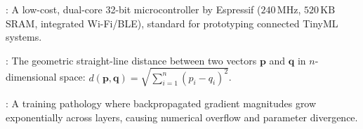 \begin{description}[leftmargin=!,labelwidth=4.5cm,itemsep=1.5ex]
\item[\textbf{ESP32}\hfill \textnormal{\sffamily\scriptsize\color{keyideablue}[IoT \& Hardware]}]: A low-cost, dual-core 32-bit microcontroller by Espressif ($240\,\text{MHz}$, $520\,\text{KB}$ SRAM, integrated Wi-Fi/BLE), standard for prototyping connected TinyML systems.
\item[\textbf{Euclidean Distance}\hfill \textnormal{\sffamily\scriptsize\color{keyideablue}[Mathematics]}]: The geometric straight-line distance between two vectors $\mathbf{p}$ and $\mathbf{q}$ in $n$-dimensional space: $d(\mathbf{p}, \mathbf{q}) = \sqrt{\sum_{i=1}^n (p_i - q_i)^2}$.
\item[\textbf{Exploding Gradient Problem}\hfill \textnormal{\sffamily\scriptsize\color{keyideablue}[Deep Learning]}]: A training pathology where backpropagated gradient magnitudes grow exponentially across layers, causing numerical overflow and parameter divergence.
\end{description}


